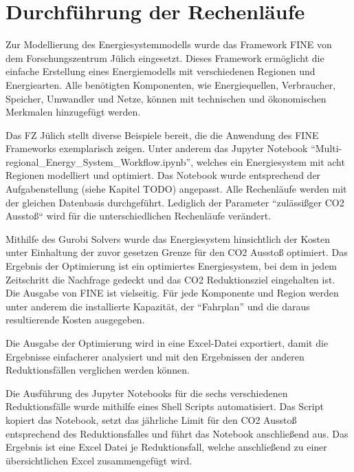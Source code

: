 \section{Durchführung der Rechenläufe}
Zur Modellierung des Energiesystemmodells wurde das Framework FINE von dem Forschungszentrum Jülich eingesetzt.
Dieses Framework ermöglicht die einfache Erstellung eines Energiemodells mit verschiedenen Regionen und Energiearten. Alle benötigten Komponenten, wie Energiequellen, Verbraucher, Speicher, Umwandler und Netze, können mit technischen und ökonomischen Merkmalen hinzugefügt werden. 

Das FZ Jülich stellt diverse Beispiele bereit, die die Anwendung des FINE Frameworks exemplarisch zeigen. Unter anderem das Jupyter Notebook ``Multi-regional\_Energy\_System\_Workflow.ipynb'', welches ein Energiesystem mit acht Regionen modelliert und optimiert. Das Notebook wurde entsprechend der Aufgabenstellung (siehe Kapitel TODO) angepasst. Alle Rechenläufe werden mit der gleichen Datenbasis durchgeführt. Lediglich der Parameter ``zulässißger CO2 Ausstoß`` wird für die unterschiedlichen Rechenläufe verändert. 

Mithilfe des Gurobi Solvers wurde das Energiesystem hinsichtlich der Kosten unter Einhaltung der zuvor gesetzen Grenze für den CO2 Ausstoß optimiert. Das Ergebnis der Optimierung ist ein optimiertes Energiesystem, bei dem in jedem Zeitschritt die Nachfrage gedeckt und das CO2 Reduktionsziel eingehalten ist. Die Ausgabe von FINE ist vielseitig. Für jede Komponente und Region werden unter anderem die installierte Kapazität, der ``Fahrplan'' und die daraus resultierende Kosten ausgegeben.

Die Ausgabe der Optimierung wird in eine Excel-Datei exportiert, damit die Ergebnisse einfacherer analysiert und mit den Ergebnissen der anderen Reduktionsfällen verglichen werden können. 

Die Ausführung des Jupyter Notebooks für die sechs verschiedenen Reduktionsfälle wurde mithilfe eines Shell Scripts automatisiert. Das Script kopiert das Notebook, setzt das jährliche Limit für den CO2 Ausstoß entsprechend des Reduktionsfalles und führt das Notebook anschließend aus. Das Ergebnis ist eine Excel Datei je Reduktionsfall, welche anschließend zu einer übersichtlichen Excel zusammengefügt wird.
